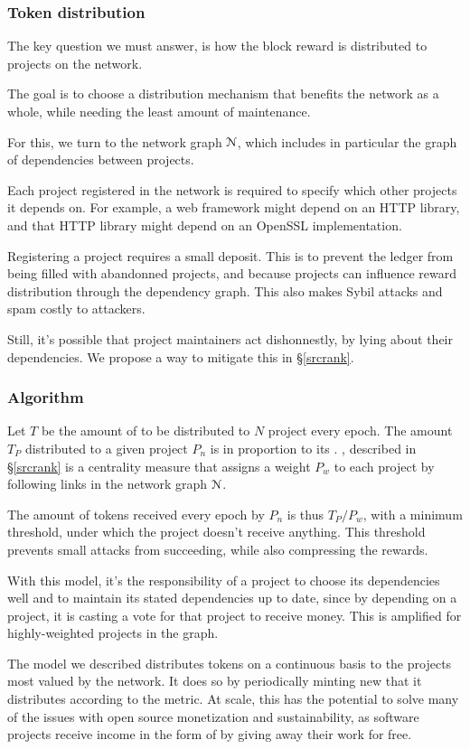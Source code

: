 \subsubsection{Token distribution}

The key question we must answer, is how the block reward is distributed to
projects on the network.

The goal is to choose a distribution mechanism that benefits the network as a
whole, while needing the least amount of maintenance.

For this, we turn to the network graph $\mathcal{N}$, which includes in
particular the graph of dependencies between projects.

Each project registered in the network is required to specify which other
projects it depends on. For example, a web framework might depend on an HTTP
library, and that HTTP library might depend on an OpenSSL implementation.

Registering a project requires a small deposit. This is to prevent the ledger
from being filled with abandonned projects, and because projects can influence
reward distribution through the dependency graph. This also makes  Sybil attacks and spam costly to attackers.

Still, it's possible that project maintainers act dishonnestly, by lying about
their dependencies. We propose a way to mitigate this in \S \ref{srcrank}.

\subsubsection{Algorithm} Let $T$ be the amount of \oscoin{} to be distributed to
$N$ project every epoch. The amount $T_P$ distributed to a given project
$P_n$ is in proportion to its \osrank{}. \osrank{}, described in \S \ref{srcrank}
is a centrality measure that assigns a weight $P_w$ to each project by following
links in the network graph $\mathcal{N}$.

The amount of tokens received every epoch by $P_n$ is thus $T_P / P_w$, with
a minimum threshold, under which the project doesn't receive anything. This
threshold prevents small attacks from succeeding, while also compressing the
rewards.

With this model, it’s the responsibility of a project to choose its
dependencies well and to maintain its stated dependencies up to date, since by
depending on a project, it is casting a vote for that project to receive money.
This is amplified for highly-weighted projects in the graph.

The model we described distributes tokens on a continuous basis to the projects
most valued by the network. It does so by periodically minting new \oscoin{}
that it distributes according to the \osrank{} metric. At scale, this has the
potential to solve many of the issues with open source monetization and
sustainability, as software projects receive income in the form of \oscoin{}
by giving away their work for free.

